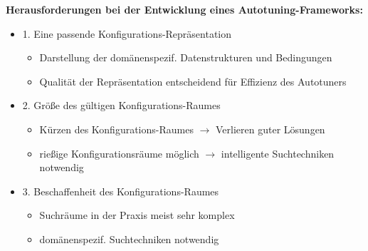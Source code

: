     \begingroup
    \begin{frame}
    \textbf{Herausforderungen bei der Entwicklung eines Autotuning-Frameworks:}
    
    \begin{itemize}
       
    \item 1. Eine passende Konfigurations-Repräsentation
        \begin{itemize}
          \item Darstellung der domänenspezif. Datenstrukturen und Bedingungen
          \item Qualität der Repräsentation entscheidend für Effizienz des Autotuners \newline
        \end{itemize}
        
    \item 2. Größe des gültigen Konfigurations-Raumes
        \begin{itemize}
          \item Kürzen des Konfigurations-Raumes $\rightarrow$ Verlieren guter Lösungen
          
          \item rießige Konfigurationsräume möglich $\rightarrow$  intelligente Suchtechniken notwendig \newline
        \end{itemize}
        
    \item 3. Beschaffenheit des Konfigurations-Raumes
      \begin{itemize}
        \item Suchräume in der Praxis meist sehr komplex 
        \item domänenspezif. Suchtechniken notwendig
        
      \end{itemize}
    \end{itemize}
        
    \end{frame}
    \endgroup
    


